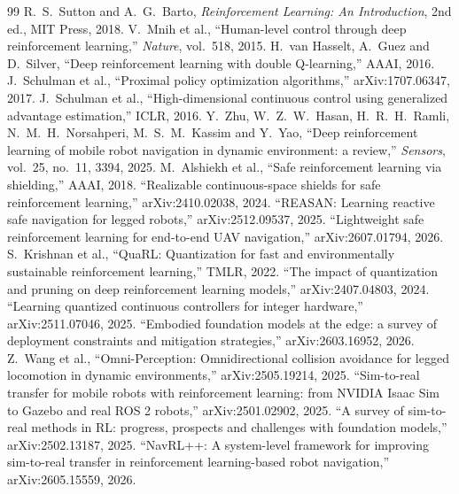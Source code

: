 \documentclass[12pt,a4paper,oneside]{report}
\begin{document}
\begin{thebibliography}{99}
 R.~S.~Sutton and A.~G.~Barto, \emph{Reinforcement Learning: An Introduction}, 2nd ed., MIT Press, 2018.
 V.~Mnih et al., ``Human-level control through deep reinforcement learning,'' \emph{Nature}, vol.~518, 2015.
 H.~van Hasselt, A.~Guez and D.~Silver, ``Deep reinforcement learning with double Q-learning,'' AAAI, 2016.
 J.~Schulman et al., ``Proximal policy optimization algorithms,'' arXiv:1707.06347, 2017.
 J.~Schulman et al., ``High-dimensional continuous control using generalized advantage estimation,'' ICLR, 2016.
 Y.~Zhu, W.~Z.~W.~Hasan, H.~R.~H.~Ramli, N.~M.~H.~Norsahperi, M.~S.~M.~Kassim and Y.~Yao, ``Deep reinforcement learning of mobile robot navigation in dynamic environment: a review,'' \emph{Sensors}, vol.~25, no.~11, 3394, 2025.
 M.~Alshiekh et al., ``Safe reinforcement learning via shielding,'' AAAI, 2018.
 ``Realizable continuous-space shields for safe reinforcement learning,'' arXiv:2410.02038, 2024.
 ``REASAN: Learning reactive safe navigation for legged robots,'' arXiv:2512.09537, 2025.
 ``Lightweight safe reinforcement learning for end-to-end UAV navigation,'' arXiv:2607.01794, 2026.
 S.~Krishnan et al., ``QuaRL: Quantization for fast and environmentally sustainable reinforcement learning,'' TMLR, 2022.
 ``The impact of quantization and pruning on deep reinforcement learning models,'' arXiv:2407.04803, 2024.
 ``Learning quantized continuous controllers for integer hardware,'' arXiv:2511.07046, 2025.
 ``Embodied foundation models at the edge: a survey of deployment constraints and mitigation strategies,'' arXiv:2603.16952, 2026.
 Z.~Wang et al., ``Omni-Perception: Omnidirectional collision avoidance for legged locomotion in dynamic environments,'' arXiv:2505.19214, 2025.
 ``Sim-to-real transfer for mobile robots with reinforcement learning: from NVIDIA Isaac Sim to Gazebo and real ROS 2 robots,'' arXiv:2501.02902, 2025.
 ``A survey of sim-to-real methods in RL: progress, prospects and challenges with foundation models,'' arXiv:2502.13187, 2025.
 ``NavRL++: A system-level framework for improving sim-to-real transfer in reinforcement learning-based robot navigation,'' arXiv:2605.15559, 2026.

\end{thebibliography}
\end{document}
